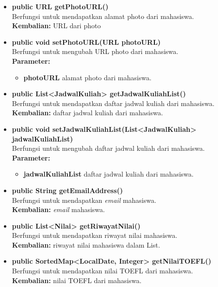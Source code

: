 \begin{enumerate}
\begin{enumerate}
\begin{itemize}
			\item \textbf{public URL getPhotoURL()}\\
				Berfungsi untuk mendapatkan alamat photo dari mahasiswa.\\
				\textbf{Kembalian:} URL dari photo
			
			\item \textbf{public void setPhotoURL(URL photoURL)}\\
				Berfungsi untuk mengubah URL photo dari mahasiswa.\\
				\textbf{Parameter:}
				\begin{itemize}
					\item \textbf{photoURL} alamat photo dari mahasiswa.
				\end{itemize}
				
			\item \textbf{public List<JadwalKuliah> getJadwalKuliahList()}\\
				Berfungsi untuk mendapatkan daftar jadwal kuliah  dari mahasiswa.\\
				\textbf{Kembalian:} daftar jadwal kuliah dari mahasiswa.
			
			\item \textbf{public void setJadwalKuliahList(List<JadwalKuliah> jadwalKuliahList)}\\
				Berfungsi untuk mengubah daftar jadwal kuliah dari mahasiswa.\\
				\textbf{Parameter:}
				\begin{itemize}
					\item \textbf{jadwalKuliahList} daftar jadwal kuliah dari mahasiswa.
				\end{itemize}
			
			\item \textbf{public String getEmailAddress()}\\
				Berfungsi untuk mendapatkan \textit{email} mahasiswa.\\
				\textbf{Kembalian:} \textit{email} mahasiswa.
				
			\item \textbf{public List<Nilai> getRiwayatNilai()}\\
				Berfungsi untuk mendapatkan riwayat nilai mahasiswa.\\
				\textbf{Kembalian:} riwayat nilai mahasiswa dalam List.
			\item \textbf{public SortedMap<LocalDate, Integer> getNilaiTOEFL()}\\
				Berfungsi untuk mendapatkan nilai TOEFL  dari mahasiswa.\\
				\textbf{Kembalian:} nilai TOEFL dari mahasiswa.
			

\end{itemize}
\end{enumerate}
\end{enumerate}
